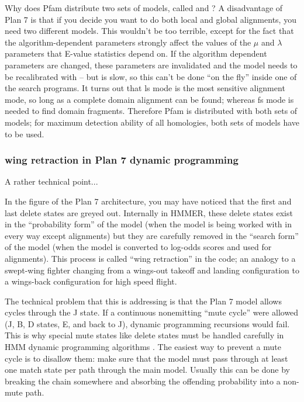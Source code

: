 \begin{srefaq}{Why does Pfam distribute two sets of models, called
 and ?}  A disadvantage of Plan 7 is that
if you decide you want to do both local and global alignments, you
need two different models.  This wouldn't be too terrible, except for
the fact that the algorithm-dependent parameters strongly affect the
values of the $\mu$ and $\lambda$ parameters that E-value statistics
depend on. If the algorithm dependent parameters are changed, these
parameters are invalidated and the model needs to be recalibrated with
 -- but  is slow, so this can't
be done ``on the fly'' inside one of the search programs. It turns out
that ls mode is the most sensitive alignment mode, so long as a
complete domain alignment can be found; whereas fs mode is needed to
find domain fragments. Therefore Pfam is distributed with both sets of
models; for maximum detection ability of all homologies, both sets of
models have to be used.
\end{srefaq}

\subsubsection{wing retraction in Plan 7 dynamic programming}

A rather technical point...

In the figure of the Plan 7 architecture, you may have noticed that
the first and last delete states are greyed out. Internally in HMMER,
these delete states exist in the ``probability form'' of the model
(when the model is being worked with in every way except alignments)
but they are carefully removed in the ``search form'' of the model
(when the model is converted to log-odds scores and used for
alignments). This process is called ``wing retraction'' in the code;
an analogy to a swept-wing fighter changing from a wings-out takeoff
and landing configuration to a wings-back configuration for high speed
flight.

The technical problem that this is addressing is that the Plan 7 model
allows cycles through the J state. If a continuous nonemitting ``mute
cycle'' were allowed (J, B, D states, E, and back to J), dynamic
programming recursions would fail. This is why special mute states
like delete states must be handled carefully in HMM dynamic
programming algorithms \cite{Durbin98}. The easiest way to prevent a
mute cycle is to disallow them: make sure that the model must pass
through at least one match state per path through the main model.
Usually this can be done by breaking the chain somewhere and absorbing
the offending probability into a non-mute path.

